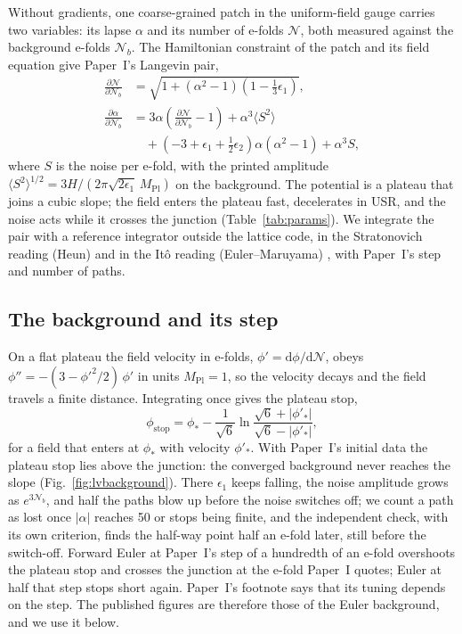 \documentclass[aps,prd,twocolumn,10pt,superscriptaddress,nofootinbib,longbibliography,floatfix]{revtex4-2}
\newcommand{\dd}{\mathrm{d}}
\newcommand{\Mpl}{M_\mathrm{Pl}}
\newcommand{\Pone}{Paper~I}
\begin{document}
Without gradients, one coarse-grained patch in the uniform-field gauge carries two variables: its lapse $\alpha$ and its number of e-folds $\mathcal{N}$, both measured against the background e-folds $\mathcal{N}_b$. The Hamiltonian constraint of the patch and its field equation give \Pone{}'s Langevin pair,
\begin{align}
\frac{\partial\mathcal{N}}{\partial\mathcal{N}_b} &= \sqrt{1 + (\alpha^2-1)\left(1-\tfrac{1}{3}\epsilon_1\right)}, \label{eq:lv1}\\
\frac{\partial\alpha}{\partial\mathcal{N}_b} &= 3\alpha\left(\frac{\partial\mathcal{N}}{\partial\mathcal{N}_b} - 1\right) + \alpha^3\langle S^2\rangle \nonumber\\
&\quad + \left(-3+\epsilon_1+\tfrac{1}{2}\epsilon_2\right)\alpha(\alpha^2-1) + \alpha^3 S , \label{eq:lv2}
\end{align}
where $S$ is the noise per e-fold, with the printed amplitude $\langle S^2\rangle^{1/2} = 3H/(2\pi\sqrt{2\epsilon_1}\,\Mpl)$ on the background. The potential is a plateau that joins a cubic slope; the field enters the plateau fast, decelerates in USR, and the noise acts while it crosses the junction (Table~\ref{tab:params}). We integrate the pair with a reference integrator outside the lattice code, in the Stratonovich reading (Heun) and in the It\^o reading (Euler--Maruyama) \cite{Kloeden:1992}, with \Pone{}'s step and number of paths.

\subsection{The background and its step}\label{sec:step}

On a flat plateau the field velocity in e-folds, $\phi' = \dd\phi/\dd\mathcal{N}$, obeys $\phi'' = -(3 - \phi'^2/2)\,\phi'$ in units $\Mpl = 1$, so the velocity decays and the field travels a finite distance. Integrating once gives the plateau stop,
\begin{equation}
\phi_\mathrm{stop} = \phi_* - \frac{1}{\sqrt6}\ln\frac{\sqrt6 + |\phi'_*|}{\sqrt6 - |\phi'_*|},
\label{eq:stop}
\end{equation}
for a field that enters at $\phi_*$ with velocity $\phi'_*$. With \Pone{}'s initial data the plateau stop lies above the junction: the converged background never reaches the slope (Fig.~\ref{fig:lvbackground}). There $\epsilon_1$ keeps falling, the noise amplitude grows as $e^{3\mathcal{N}_b}$, and half the paths blow up before the noise switches off; we count a path as lost once $|\alpha|$ reaches 50 or stops being finite, and the independent check, with its own criterion, finds the half-way point half an e-fold later, still before the switch-off. Forward Euler at \Pone{}'s step of a hundredth of an e-fold overshoots the plateau stop and crosses the junction at the e-fold \Pone{} quotes; Euler at half that step stops short again. \Pone{}'s footnote says that its tuning depends on the step. The published figures are therefore those of the Euler background, and we use it below.
\end{document}

